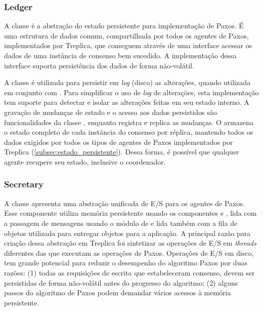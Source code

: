 \subsubsection{Ledger}

A classe  é a abstração do estado persistente para implementação de
Paxos. É uma estrutura de dados comum, compartilhada por todos os agentes de Paxos,
implementados por Treplica, que conseguem através de uma interface acessar os dados de uma
instância de consenso bem sucedido. A implementação dessa interface suporta persistência
dos dados de forma não-volátil.

A classe  é utilizada para persistir em \emph{log} (disco) as
alterações, quando utilizada em conjunto com . Para simplificar o uso
de \emph{log} de alterações, esta implementação tem suporte para detectar e isolar as
alterações feitas em seu estado interno. A gravação de mudanças de estado e o acesso aos
dados persistidos são funcionalidades da classe , enquanto
 registra e replica as mudanças. O  armazena o
estado completo de cada instância do consenso por réplica, mantendo todos os dados
exigidos por todos os tipos de agentes de Paxos implementados por Treplica
(\autoref{subsec:estado_persistente}). Dessa forma, é possível que qualquer agente
recupere seu estado, inclusive o coordenador.

\subsubsection{Secretary}

A classe  apresenta uma abstração unificada de E/S para os agentes de
Paxos. Esse componente utiliza memória persistente usando os componentes
 e , lida com a passagem de mensagens usando o
módulo de  e lida também com a fila de objetos utilizada para entregar
objetos para a aplicação. A principal razão para criação dessa abstração em Treplica foi
sintetizar as operações de E/S em \emph{threads} diferentes das que executam as operações
de Paxos. Operações de E/S em disco, tem grande potencial para reduzir o desempenho do
algoritmo Paxos por duas razões: (1) todas as requisições de escrita que estabeleceram
consenso, devem ser persistidas de forma não-volátil antes do progresso do algoritmo; (2)
alguns passos do algoritmo de Paxos podem demandar vários acessos à memória persistente.


